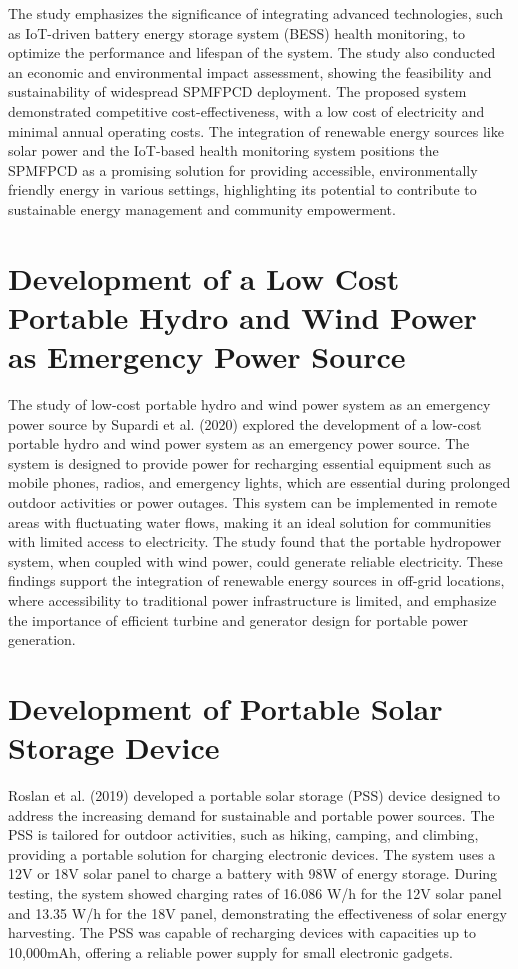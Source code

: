 {The study emphasizes the significance of integrating advanced technologies, such as IoT-driven battery energy storage system (BESS) health monitoring, to optimize the performance and lifespan of the system. The study also conducted an economic and environmental impact assessment, showing the feasibility and sustainability of widespread SPMFPCD deployment. The proposed system demonstrated competitive cost-effectiveness, with a low cost of electricity and minimal annual operating costs. The integration of renewable energy sources like solar power and the IoT-based health monitoring system positions the SPMFPCD as a promising solution for providing accessible, environmentally friendly energy in various settings, highlighting its potential to contribute to sustainable energy management and community empowerment.

\section{Development of a Low Cost Portable Hydro and Wind Power as Emergency Power Source}

The study of low-cost portable hydro and wind power system as an emergency power source by Supardi et al. (2020) explored the development of a low-cost portable hydro and wind power system as an emergency power source. The system is designed to provide power for recharging essential equipment such as mobile phones, radios, and emergency lights, which are essential during prolonged outdoor activities or power outages. This system can be implemented in remote areas with fluctuating water flows, making it an ideal solution for communities with limited access to electricity. The study found that the portable hydropower system, when coupled with wind power, could generate reliable electricity. These findings support the integration of renewable energy sources in off-grid locations, where accessibility to traditional power infrastructure is limited, and emphasize the importance of efficient turbine and generator design for portable power generation.

\section{Development of Portable Solar Storage Device}

Roslan et al. (2019) developed a portable solar storage (PSS) device designed to address the increasing demand for sustainable and portable power sources. The PSS is tailored for outdoor activities, such as hiking, camping, and climbing, providing a portable solution for charging electronic devices. The system uses a 12V or 18V solar panel to charge a battery with 98W of energy storage. During testing, the system showed charging rates of 16.086 W/h for the 12V solar panel and 13.35 W/h for the 18V panel, demonstrating the effectiveness of solar energy harvesting. The PSS was capable of recharging devices with capacities up to 10,000mAh, offering a reliable power supply for small electronic gadgets.

}
